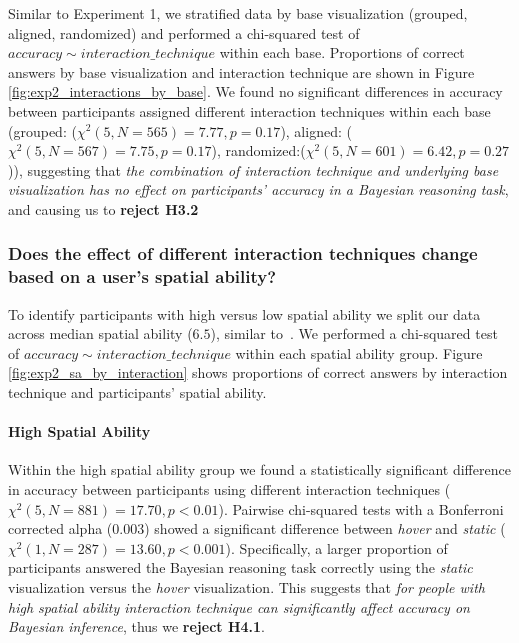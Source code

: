 Similar to Experiment 1, we stratified data by base visualization (grouped, aligned, randomized) and performed a chi-squared test of $accuracy \sim interaction\_technique$ within each base. Proportions of correct answers by base visualization and interaction technique are shown in Figure \ref{fig:exp2_interactions_by_base}. We found no significant differences in accuracy between participants assigned different interaction techniques within each base (grouped: ($\chi^2(5, N = 565) = 7.77, p = 0.17$), aligned: ($\chi^2(5, N = 567) = 7.75, p = 0.17$), randomized:($\chi^2(5, N = 601) = 6.42, p = 0.27$)), suggesting that \textit{the combination of interaction technique and underlying base visualization has no effect on participants' accuracy in a Bayesian reasoning task}, and causing us to \textbf{reject H3.2} %


\subsubsection{Does the effect of different interaction techniques change based on a user's spatial ability?}
To identify participants with high versus low spatial ability we split our data across median spatial ability ($6.5$), similar to~\cite{ottley2016Bayesian}. We performed a chi-squared test of $accuracy \sim interaction\_technique$ within each spatial ability group. Figure \ref{fig:exp2_sa_by_interaction} shows proportions of correct answers by interaction technique and participants' spatial ability.  

\paragraph{High Spatial Ability}
Within the high spatial ability group we found a statistically significant difference in accuracy between participants using different interaction techniques ($\chi^2(5, N =  881) = 17.70, p < 0.01$). Pairwise chi-squared tests with a Bonferroni corrected alpha ($0.003$) showed a significant difference between \textit{hover} and \textit{static} ($\chi^2(1, N = 287) = 13.60, p < 0.001$). Specifically, a larger proportion of participants answered the Bayesian reasoning task correctly using the \textit{static} visualization versus the \textit{hover} visualization. This suggests that \textit{for people with high spatial ability interaction technique can significantly affect accuracy on Bayesian inference}, thus we \textbf{reject H4.1}. 


